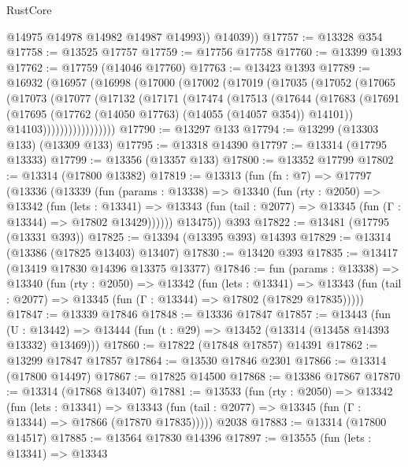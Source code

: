 \begin{lexlean}{RustCore}
\begin{coremodule}
            @14975
            @14978
            @14982
            @14987
            @14993))
        @14039))
@17757 := @13328 @354
@17758 := @13525 @17757
@17759 := @17756 @17758
@17760 := @13399 @1393
@17762 := @17759 (@14046 @17760)
@17763 := @13423 @1393
@17789 := @16932
    (@16957
      (@16998
        (@17000
          (@17002
            (@17019
              (@17035
                (@17052
                  (@17065
                    (@17073
                      (@17077
                        (@17132
                          (@17171
                            (@17474
                              (@17513
                                (@17644
                                  (@17683
                                    (@17691
                                      (@17695
                                        (@17762 (@14050 @17763) (@14055 (@14057 @354)) @14101))
                                      @14103)))))))))))))))))
@17790 := @13297 @133
@17794 := @13299 (@13303 @133) (@13309 @133)
@17795 := @13318 @14390
@17797 := @13314 (@17795 @13333)
@17799 := @13356 (@13357 @133)
@17800 := @13352 @17799
@17802 := @13314 (@17800 @13382)
@17819 := @13313
    (fun (fn : @7) =>
    @17797
      (@13336
        (@13339
          (fun (params : @13338) =>
          @13340
            (fun (rty : @2050) =>
            @13342
              (fun (lets : @13341) =>
              @13343 (fun (tail : @2077) => @13345 (fun (Γ : @13344) => @17802 @13429))))))
        @13475))
    @393
@17822 := @13481 (@17795 (@13331 @393))
@17825 := @13394 (@13395 @393) @14393
@17829 := @13314 (@13386 (@17825 @13403) @13407)
@17830 := @13420 @393
@17835 := @13417 (@13419 @17830 @14396 @13375 @13377)
@17846 := fun (params : @13338) =>
  @13340
    (fun (rty : @2050) =>
    @13342
      (fun (lets : @13341) =>
      @13343 (fun (tail : @2077) => @13345 (fun (Γ : @13344) => @17802 (@17829 @17835)))))
@17847 := @13339 @17846
@17848 := @13336 @17847
@17857 := @13443
    (fun (U : @13442) => @13444 (fun (t : @29) => @13452 (@13314 (@13458 @14393 @13332) @13469)))
@17860 := @17822 (@17848 @17857) @14391
@17862 := @13299 @17847 @17857
@17864 := @13530 @17846 @2301
@17866 := @13314 (@17800 @14497)
@17867 := @17825 @14500
@17868 := @13386 @17867
@17870 := @13314 (@17868 @13407)
@17881 := @13533
    (fun (rty : @2050) =>
    @13342
      (fun (lets : @13341) =>
      @13343 (fun (tail : @2077) => @13345 (fun (Γ : @13344) => @17866 (@17870 @17835)))))
    @2038
@17883 := @13314 (@17800 @14517)
@17885 := @13564 @17830 @14396
@17897 := @13555
    (fun (lets : @13341) =>
    @13343

\end{coremodule}
\end{lexlean}
